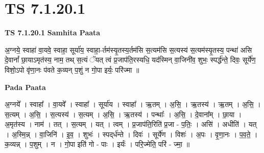 \documentclass[17pt]{extarticle}
\begin{document}

\section{ TS 7.1.20.1 }

\textbf{TS 7.1.20.1 } \newline
\textbf{Samhita Paata} \newline

अ॒ग्नये॒ स्वाहा॑ वा॒यवे॒ स्वाहा॒ सूर्या॑य॒ स्वाहा॒-र्तम॑स्यृ॒तस्य॒र्तम॑सि स॒त्यम॑सि स॒त्यस्य॑ स॒त्यम॑स्यृ॒तस्य॒ पन्था॑ असि दे॒वानां᳚ छा॒याऽमृत॑स्य॒ नाम॒ तथ् स॒त्यं ॅयत् त्वं प्र॒जाप॑ति॒रस्यधि॒ यद॑स्मिन् वा॒जिनी॑व॒ शुभः॒ स्पर्द्ध॑न्ते॒ दिवः॒ सूर्ये॑ण॒ विशो॒ऽपो वृ॑णा॒नः प॑वते क॒व्यन् प॒शुं न गो॒पा इर्यः॒ परि॑ज्मा ॥ \newline

\textbf{Pada Paata} \newline

अ॒ग्नये᳚ । स्वाहा᳚ । वा॒यवे᳚ । स्वाहा᳚ । सूर्या॑य । स्वाहा᳚ । ऋ॒तम् । अ॒सि॒ । ऋ॒तस्य॑ । ऋ॒तम् । अ॒सि॒ । स॒त्यम् । अ॒सि॒ । स॒त्यस्य॑ । स॒त्यम् । अ॒सि॒ । ऋ॒तस्य॑ । पन्थाः᳚ । अ॒सि॒ । दे॒वाना᳚म् । छा॒या । अ॒मृत॑स्य । नाम॑ । तत् । स॒त्यम् । यत् । त्वम् । प्र॒जाप॑ति॒रिति॑ प्र॒जा - प॒तिः॒ । असि॑ । अधीति॑ । यत् । अ॒स्मि॒न्न् । वा॒जिनि॑ । इ॒व॒ । शुभः॑ । स्पद्‌र्ध॑न्ते । दिवः॑ । सूर्ये॑ण । विशः॑ । अ॒पः । वृ॒णा॒नः । प॒व॒ते॒ । क॒व्यन्न् । प॒शुम् । न । गो॒पा इति॑ गो - पाः । इर्यः॑ । परि॒ज्मेति॒ परि॑ - ज्मा॒ ॥  \newline
\end{document}

